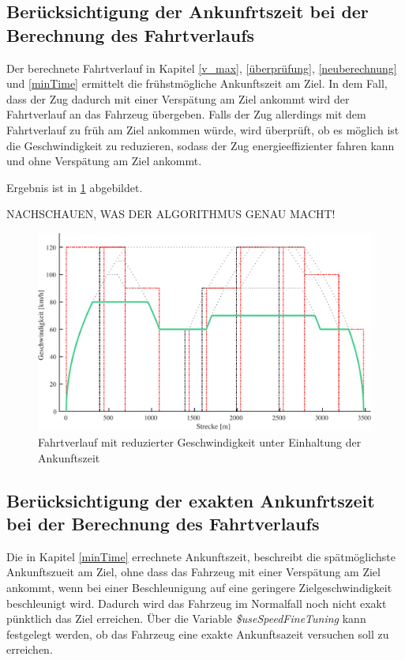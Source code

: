 \subsection{Berücksichtigung der Ankunfrtszeit bei der Berechnung des Fahrtverlaufs} \label{time}
Der berechnete Fahrtverlauf in Kapitel \ref{v_max}, \ref{überprüfung}, \ref{neuberechnung} und \ref{minTime} ermittelt die frühstmögliche Ankunftszeit am Ziel. In dem Fall, dass der Zug dadurch mit einer Verspätung am Ziel ankommt wird der Fahrtverlauf an das Fahrzeug übergeben. Falls der Zug allerdings mit dem Fahrtverlauf zu früh am Ziel ankommen würde, wird überprüft, ob es möglich ist die Geschwindigkeit zu reduzieren, sodass der Zug energieeffizienter fahren kann und ohne Verspätung am Ziel ankommt.

Ergebnis ist in \ref{fig:it10} abgebildet.

NACHSCHAUEN, WAS DER ALGORITHMUS GENAU MACHT!

\begin{figure}
  \includegraphics[width=\linewidth]{../matlab/it10.pdf}
  \caption{Fahrtverlauf mit reduzierter Geschwindigkeit unter Einhaltung der Ankunftszeit}
  \label{fig:it10}
\end{figure}


\subsection{Berücksichtigung der exakten Ankunfrtszeit bei der Berechnung des Fahrtverlaufs} \label{time2}

Die in Kapitel \ref{minTime} errechnete Ankunftszeit, beschreibt die spätmöglichste Ankunftszueit am Ziel, ohne dass das Fahrzeug mit einer Verspätung am Ziel ankommt, wenn bei einer Beschleunigung auf eine geringere Zielgeschwindigkeit beschleunigt wird. Dadurch wird das Fahrzeug im Normalfall noch nicht exakt pünktlich das Ziel erreichen. Über die Variable \textit{\$useSpeedFineTuning} kann festgelegt werden, ob das Fahrzeug eine exakte Ankunftsazeit versuchen soll zu erreichen. 

